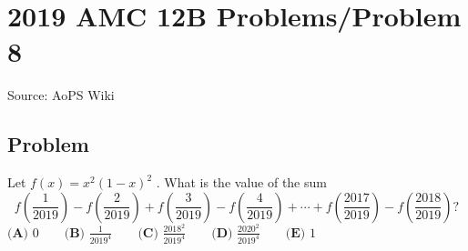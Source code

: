 \documentclass[12pt]{article}
\begin{document}
\section*{{2019 AMC 12B Problems/Problem 8}}
Source: AoPS Wiki

\subsection*{Problem}
Let $f(x) = x^{2}(1-x)^{2}$ . What is the value of the sum \[f \left(\frac{1}{2019} \right)-f \left(\frac{2}{2019} \right)+f \left(\frac{3}{2019} \right)-f \left(\frac{4}{2019} \right)+\cdots + f \left(\frac{2017}{2019} \right) - f \left(\frac{2018}{2019} \right)?\] $\textbf{(A) }0\qquad\textbf{(B) }\frac{1}{2019^{4}}\qquad\textbf{(C) }\frac{2018^{2}}{2019^{4}}\qquad\textbf{(D) }\frac{2020^{2}}{2019^{4}}\qquad\textbf{(E) }1$
\end{document}
